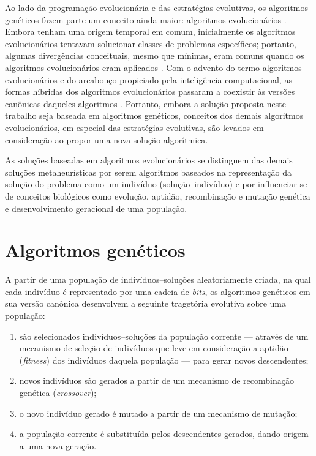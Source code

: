 \documentclass[relatorio,nocolorlinks]{inf-ufg}
\begin{document}
Ao lado da programa\c{c}\~{a}o evolucion\'{a}ria e das estrat\'{e}gias evolutivas, os algoritmos gen\'{e}ticos fazem parte um conceito ainda
maior: algoritmos evolucion\'{a}rios \cite{DeJong2006}. Embora tenham uma origem temporal em comum, inicialmente os algoritmos evolucion\'{a}rios
tentavam solucionar classes de problemas espec\'{i}ficos; portanto, algumas diverg\^{e}ncias conceituais, mesmo que m\'{i}nimas, eram comuns
quando os algoritmos evolucion\'{a}rios eram aplicados \cite{DeJong2006}. Com o advento do termo algoritmos evolucion\'{a}rios e do arcabou\c{c}o
propiciado pela intelig\^{e}ncia computacional, as formas h\'{i}bridas dos algoritmos evolucion\'{a}rios passaram a coexistir \`{a}s vers\~{o}es
can\^{o}nicas daqueles algoritmos \cite{DeJong2006}. Portanto, embora a solu\c{c}\~{a}o proposta neste trabalho seja baseada em algoritmos
gen\'{e}ticos, conceitos dos demais algoritmos evolucion\'{a}rios, em especial das estrat\'{e}gias evolutivas, s\~{a}o levados em
considera\c{c}\~{a}o ao propor uma nova solu\c{c}\~{a}o algor\'{i}tmica.

As solu\c{c}\~{o}es baseadas em algoritmos evolucion\'{a}rios se distinguem das demais solu\c{c}\~{o}es metaheur\'{i}sticas por serem algoritmos
baseados na representa\c{c}\~{a}o da solu\c{c}\~{a}o do problema como um indiv\'{i}duo (solu\c{c}\~{a}o--indiv\'{i}duo) e por influenciar-se de
conceitos biol\'{o}gicos como evolu\c{c}\~{a}o, aptid\~{a}o, recombina\c{c}\~{a}o e muta\c{c}\~{a}o gen\'{e}tica e desenvolvimento geracional de
uma popula\c{c}\~{a}o.

\section{Algoritmos gen\'{e}ticos}

A partir de uma popula\c{c}\~{a}o de indiv\'{i}duos--solu\c{c}\~{o}es aleatoriamente criada, na qual cada indiv\'{i}duo \'{e} representado por
uma cadeia de \textit{bits}, os algoritmos gen\'{e}ticos em sua vers\~{a}o can\^{o}nica desenvolvem a seguinte traget\'{o}ria evolutiva sobre uma
popula\c{c}\~{a}o:
\begin{enumerate}
\item s\~{a}o selecionados indiv\'{i}duos--solu\c{c}\~{o}es da popula\c{c}\~{a}o corrente --- atrav\'{e}s de um mecanismo de sele\c{c}\~{a}o de
indiv\'{i}duos que leve em considera\c{c}\~{a}o a aptid\~{a}o (\textit{fitness}) dos indiv\'{i}duos daquela popula\c{c}\~{a}o --- para gerar novos
descendentes;
\item novos indiv\'{i}duos s\~{a}o gerados a partir de um mecanismo de recombina\c{c}\~{a}o gen\'{e}tica (\textit{crossover});
\item o novo indiv\'{i}duo gerado \'{e} mutado a partir de um mecanismo de muta\c{c}\~{a}o;
\item a popula\c{c}\~{a}o corrente \'{e} substitu\'{i}da pelos descendentes gerados, dando origem a uma nova gera\c{c}\~{a}o.
\end{enumerate}
\end{document}
